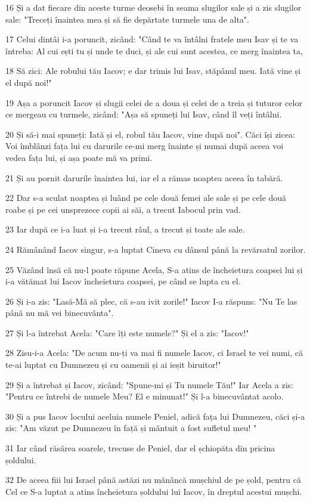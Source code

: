 \par 16 Și a dat fiecare din aceste turme deosebi în seama slugilor sale și a zis slugilor sale: "Treceți înaintea mea și să fie depărtate turmele una de alta".
\par 17 Celui dintâi i-a poruncit, zicând: "Când te va întâlni fratele meu Isav și te va întreba: Al cui ești tu și unde te duci, și ale cui sunt acestea, ce merg înaintea ta,
\par 18 Să zici: Ale robului tău Iacov; e dar trimis lui Isav, stăpânul meu. Iată vine și el după noi!"
\par 19 Așa a poruncit Iacov și slugii celei de a doua și celei de a treia și tuturor celor ce mergeau cu turmele, zicând: "Așa să spuneți lui Isav, când îl veți întâlni.
\par 20 Și să-i mai spuneți: Iată și el, robul tău Iacov, vine după noi". Căci își zicea: Voi îmblânzi fața lui cu darurile ce-mi merg înainte și numai după aceea voi vedea fața lui, și așa poate mă va primi.
\par 21 Și au pornit darurile înaintea lui, iar el a rămas noaptea aceea în tabără.
\par 22 Dar s-a sculat noaptea și luând pe cele două femei ale sale și pe cele două roabe și pe cei unsprezece copii ai săi, a trecut Iabocul prin vad.
\par 23 Iar după ce i-a luat și i-a trecut râul, a trecut și toate ale sale.
\par 24 Rămânând Iacov singur, s-a luptat Cineva cu dânsul până la revărsatul zorilor.
\par 25 Văzând însă că nu-l poate răpune Acela, S-a atins de încheietura coapsei lui și i-a vătămat lui Iacov încheietura coapsei, pe când se lupta cu el.
\par 26 Și i-a zis: "Lasă-Mă să plec, că s-au ivit zorile!" Iacov I-a răspuns: "Nu Te las până nu mă vei binecuvânta".
\par 27 Și l-a întrebat Acela: "Care îți este numele?" Și el a zis: "Iacov!"
\par 28 Zisu-i-a Acela: "De acum nu-ți va mai fi numele Iacov, ci Israel te vei numi, că te-ai luptat cu Dumnezeu și cu oamenii și ai ieșit biruitor!"
\par 29 Și a întrebat și Iacov, zicând: "Spune-mi și Tu numele Tău!" Iar Acela a zis: "Pentru ce întrebi de numele Meu? El e minunat!" Și l-a binecuvântat acolo.
\par 30 Și a pus Iacov locului aceluia numele Peniel, adică fața lui Dumnezeu, căci și-a zis: "Am văzut pe Dumnezeu în față și mântuit a fost sufletul meu! "
\par 31 Iar când răsărea soarele, trecuse de Peniel, dar el șchiopăta din pricina șoldului.
\par 32 De aceea fiii lui Israel până astăzi nu mănâncă mușchiul de pe șold, pentru că Cel ce S-a luptat a atins încheietura șoldului lui Iacov, în dreptul acestui mușchi.

